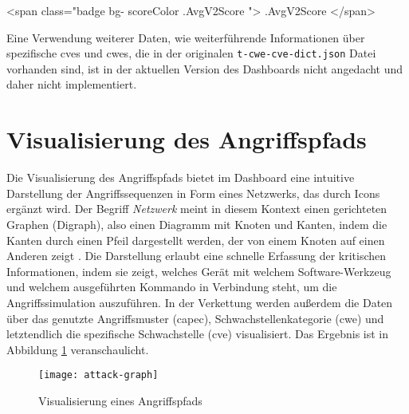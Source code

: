 \begin{code}[caption=Aufbau eines \gls{html} Elements zur Darstellung eines CVSS Werts in einer Bootstrap Komponente, label={listing:template-cvss}]
    <span class="badge bg-{{ scoreColor .AvgV2Score }}">{{ .AvgV2Score }}</span>
\end{code}

Eine Verwendung weiterer Daten, wie weiterführende Informationen über spezifische \glspl{cve} und \glspl{cwe}, die in der originalen \verb|t-cwe-cve-dict.json| Datei vorhanden sind, ist in der aktuellen Version des Dashboards nicht angedacht und daher nicht implementiert.

\section{Visualisierung des Angriffspfads}
\label{sec:impl-visualisierungDesAngriffspfads}
Die Visualisierung des Angriffspfads bietet im Dashboard eine intuitive Darstellung der Angriffssequenzen in Form eines Netzwerks, das durch Icons ergänzt wird. Der Begriff \textit{Netzwerk} meint in diesem Kontext einen gerichteten Graphen (Digraph), also einen Diagramm mit Knoten und Kanten, indem die Kanten durch einen Pfeil dargestellt werden, der von einem Knoten auf einen Anderen zeigt \autocite{DigraphDefinition}. Die Darstellung erlaubt eine schnelle Erfassung der kritischen Informationen, indem sie zeigt, welches Gerät mit welchem Software-Werkzeug und welchem ausgeführten Kommando in Verbindung steht, um die Angriffssimulation auszuführen. In der Verkettung werden außerdem die Daten über das genutzte Angriffsmuster (\gls{capec}), Schwachstellenkategorie (\gls{cwe}) und letztendlich die spezifische Schwachstelle (\gls{cve}) visualisiert. Das Ergebnis ist in Abbildung \ref{fig:attack-graph} veranschaulicht.
\begin{figure}
    \centering
    \texttt{[image: attack-graph]}
    \caption{Visualisierung eines Angriffspfads}
    \label{fig:attack-graph}
\end{figure}

